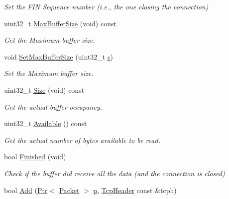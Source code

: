 \begin{DoxyCompactItemize}
\begin{DoxyCompactList}\small\item\em Set the F\+IN Sequence number (i.\+e., the one closing the connection) \end{DoxyCompactList}\item 
uint32\+\_\+t \hyperlink{classns3_1_1TcpRxBuffer_a93a1a92164515bd951bad115444eac00}{Max\+Buffer\+Size} (void) const 
\begin{DoxyCompactList}\small\item\em Get the Maximum buffer size. \end{DoxyCompactList}\item 
void \hyperlink{classns3_1_1TcpRxBuffer_a3b37c1b3b91aa2e6e812cba3c2575f75}{Set\+Max\+Buffer\+Size} (uint32\+\_\+t \hyperlink{generate__test__data__lte__sinr_8m_ad83eeb3a142285d1243a08c6b7026df8}{s})
\begin{DoxyCompactList}\small\item\em Set the Maximum buffer size. \end{DoxyCompactList}\item 
uint32\+\_\+t \hyperlink{classns3_1_1TcpRxBuffer_a51938b2cb6cd42c1beedd6f67385f599}{Size} (void) const 
\begin{DoxyCompactList}\small\item\em Get the actual buffer occupancy. \end{DoxyCompactList}\item 
uint32\+\_\+t \hyperlink{classns3_1_1TcpRxBuffer_ab89d1bfde21bc59f35a319328b606283}{Available} () const 
\begin{DoxyCompactList}\small\item\em Get the actual number of bytes available to be read. \end{DoxyCompactList}\item 
bool \hyperlink{classns3_1_1TcpRxBuffer_a7674e0a088b55b67a2310c40360b9ed6}{Finished} (void)
\begin{DoxyCompactList}\small\item\em Check if the buffer did receive all the data (and the connection is closed) \end{DoxyCompactList}\item 
bool \hyperlink{classns3_1_1TcpRxBuffer_a35a036383b8976cb79738c28aa01d5d0}{Add} (\hyperlink{classns3_1_1Ptr}{Ptr}$<$ \hyperlink{classns3_1_1Packet}{Packet} $>$ \hyperlink{lte__link__budget__x2__handover__measures_8m_ac9de518908a968428863f829398a4e62}{p}, \hyperlink{classns3_1_1TcpHeader}{Tcp\+Header} const \&tcph)
\item 

\end{DoxyCompactItemize}
